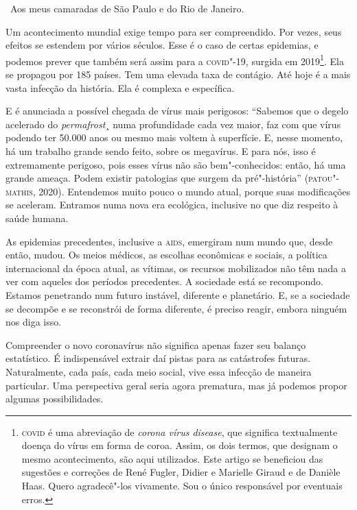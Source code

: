 

\hfill\ Aos meus camaradas de São Paulo e do Rio de Janeiro.

\noindent{}Um acontecimento mundial exige tempo para ser compreendido. Por vezes,
seus efeitos se estendem por vários séculos. Esse é o caso de certas
epidemias, e podemos prever que também será assim para a \textsc{covid}"-19,
surgida em 2019\footnote{\textsc{covid} é uma abreviação de \emph{corona vírus
  disease}, que significa textualmente doença do vírus em forma de
  coroa. Assim, os dois termos, que designam o mesmo acontecimento, são
  aqui utilizados. Este artigo se beneficiou das sugestões e correções
  de René Fugler, Didier e Marielle Giraud e de Danièle Haas. Quero
  agradecê"-los vivamente. Sou o único responsável por eventuais erros.}.
Ela se propagou por 185 países. Tem uma elevada taxa de contágio. Até
hoje é a mais vasta infecção da história. Ela é complexa e específica.

E é anunciada a possível chegada de vírus mais perigosos: ``Sabemos que
o degelo acelerado do \emph{permafrost}¸ numa profundidade cada vez
maior, faz com que vírus podendo ter 50.000 anos ou mesmo mais voltem à
superfície. E, nesse momento, há um trabalho grande sendo feito, sobre
os megavírus. E para nós, isso é extremamente perigoso, pois esses vírus
não são bem"-conhecidos: então, há uma grande ameaça. Podem existir
patologias que surgem da pré"-história'' (\textsc{patou"-mathis}, 2020). Entendemos
muito pouco o mundo atual, porque suas modificações se aceleram.
Entramos numa nova era ecológica, inclusive no que diz respeito à saúde
humana.

As epidemias precedentes, inclusive a \textsc{aids}, emergiram num mundo que,
desde então, mudou. Os meios médicos, as escolhas econômicas e sociais,
a política internacional da época atual, as vítimas, os recursos
mobilizados não têm nada a ver com aqueles dos períodos precedentes. A
sociedade está se recompondo. Estamos penetrando num futuro instável,
diferente e planetário. E, se a sociedade se decompõe e se reconstrói de
forma diferente, é preciso reagir, embora ninguém nos diga isso.

Compreender o novo coronavírus não significa apenas fazer seu balanço
estatístico. É indispensável extrair daí pistas para as catástrofes
futuras. Naturalmente, cada país, cada meio social, vive essa infecção
de maneira particular. Uma perspectiva geral seria agora prematura, mas
já podemos propor algumas possibilidades.

